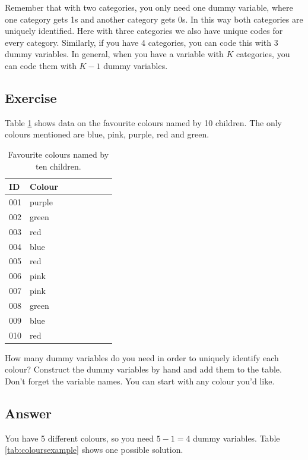 \documentclass[]{book}\usepackage[]{graphicx}\usepackage[]{color}
\begin{document}
Remember that with two categories, you only need one dummy variable, where one category gets 1s and another category gets 0s. In this way both categories are uniquely identified. Here with three categories we also have unique codes for every category. Similarly, if you have 4 categories, you can code this with 3 dummy variables. In general, when you have a variable with $K$ categories, you can code them with $K-1$ dummy variables.


\subsection{Exercise}

Table \ref{tab:colours} shows data on the favourite colours named by 10 children. The only colours mentioned are blue, pink, purple, red and green. 

 \begin{table}
 \caption{Favourite colours named by ten children.}
 \begin{tabular}{llrrrrrr}
 ID & Colour &   &&&&&\\ \hline
  001 &purple & &&&&&\\
  002 &green &  &&&&&\\
  003 &red &  &&&&&\\
  004 &blue &  &&&&&\\
  005 &red &  &&&&&\\
  006 &pink &  &&&&&\\
  007 &pink &  &&&&&\\
  008 &green &  &&&&&\\
  009 &blue &  &&&&&\\
  010 &red &  &&&&&\\
 \end{tabular}
 \label{tab:colours}
 \end{table}

How many dummy variables do you need in order to uniquely identify each colour? Construct the dummy variables by hand and add them to the table. Don't forget the variable names. You can start with any colour you'd like.


\subsection{Answer}
You have 5 different colours, so you need $5-1=4$ dummy variables. Table \ref{tab:coloursexample} shows one possible solution. 
\end{document}
